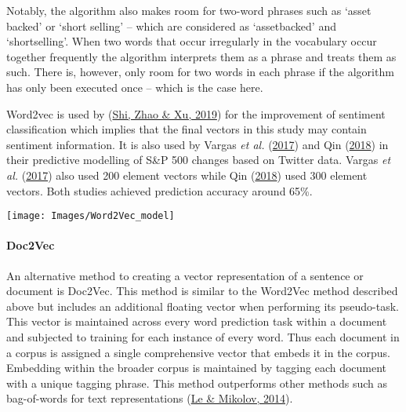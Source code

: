 \documentclass[11pt,preprint, authoryear]{elsarticle}
\let\origfigure\figure
\let\endorigfigure\endfigure
\renewenvironment{figure}[1][2] {
    \expandafter\origfigure\expandafter[H]
} {
    \endorigfigure
}
\numberwithin{equation}{section}
\numberwithin{figure}{section}
\numberwithin{table}{section}
\begin{document}
Notably, the algorithm also makes room for two-word phrases such as
`asset backed' or `short selling' -- which are considered as
`assetbacked' and `shortselling'. When two words that occur irregularly
in the vocabulary occur together frequently the algorithm interprets
them as a phrase and treats them as such. There is, however, only room
for two words in each phrase if the algorithm has only been executed
once -- which is the case here.

Word2vec is used by (\protect\hyperlink{ref-shi2019word2vec}{Shi, Zhao
\& Xu, 2019}) for the improvement of sentiment classification which
implies that the final vectors in this study may contain sentiment
information. It is also used by Vargas \emph{et al.}
(\protect\hyperlink{ref-vargas2017deep}{2017}) and Qin
(\protect\hyperlink{ref-qin230natural}{2018}) in their predictive
modelling of S\&P 500 changes based on Twitter data. Vargas \emph{et
al.} (\protect\hyperlink{ref-vargas2017deep}{2017}) also used 200
element vectors while Qin (\protect\hyperlink{ref-qin230natural}{2018})
used 300 element vectors. Both studies achieved prediction accuracy
around 65\%.

\begin{figure}[H]

{\centering \texttt{[image: Images/Word2Vec\_model]} 

}

\caption{Word2Vec Model \label{Figure1}}\label{fig:Word2Vec Model}
\end{figure}

\hypertarget{doc2vec}{%
\paragraph{\texorpdfstring{Doc2Vec
\label{Doc2Vec}}{Doc2Vec }}\label{doc2vec}}

An alternative method to creating a vector representation of a sentence
or document is Doc2Vec. This method is similar to the Word2Vec method
described above but includes an additional floating vector when
performing its pseudo-task. This vector is maintained across every word
prediction task within a document and subjected to training for each
instance of every word. Thus each document in a corpus is assigned a
single comprehensive vector that embeds it in the corpus. Embedding
within the broader corpus is maintained by tagging each document with a
unique tagging phrase. This method outperforms other methods such as
bag-of-words for text representations
(\protect\hyperlink{ref-le2014distributed}{Le \& Mikolov, 2014}).
\end{document}
